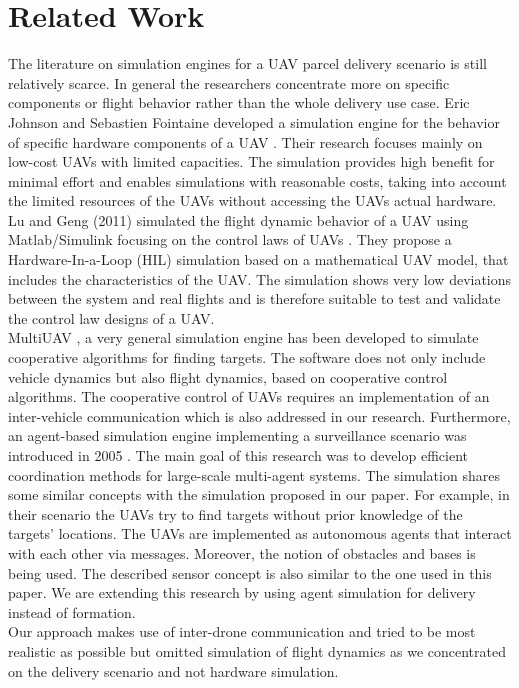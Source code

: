 \section{Related Work}
The literature on simulation engines for a UAV parcel delivery scenario is still relatively scarce. In general the researchers concentrate more on specific components or flight behavior rather than the whole delivery use case. Eric Johnson and Sebastien Fointaine developed a simulation engine for the behavior of specific hardware components of a UAV \cite{johnson.2001}. Their research focuses mainly on low-cost UAVs with limited capacities. The simulation provides high benefit for minimal effort and enables simulations with reasonable costs, taking into account the limited resources of the UAVs without accessing the UAVs actual hardware. Lu and Geng (2011) simulated the flight dynamic behavior of a UAV using Matlab/Simulink focusing on the control laws of UAVs \cite{lu.2011}. They propose a Hardware-In-a-Loop (HIL) simulation based on a mathematical UAV model, that includes the characteristics of the UAV. The simulation shows very low deviations between the system and real flights and is therefore suitable to test and validate the control law designs of a UAV. \\
MultiUAV \cite{rasmussen.2003}, a very general simulation engine has been 
developed to simulate cooperative algorithms for finding targets. The software 
does not only include vehicle dynamics but also flight dynamics, based on 
cooperative control algorithms. The cooperative control of UAVs requires an 
implementation of an inter-vehicle communication which is also addressed in our 
research. Furthermore, an agent-based simulation engine implementing a 
surveillance scenario was introduced in 2005 . The main 
goal of this research was to develop efficient coordination methods for 
large-scale multi-agent systems. The simulation shares some similar concepts 
with the simulation proposed in our paper. For example, in their scenario the 
UAVs try to find targets without prior knowledge of the targets’ locations. The 
UAVs are implemented as autonomous agents that interact with each other via 
messages. Moreover, the notion of obstacles and bases is being used. The 
described sensor concept is also similar to the one used in this paper. We are 
extending this research by using agent simulation for delivery instead of 
formation.\\
Our approach makes use of inter-drone communication and tried to be most realistic as possible but omitted simulation of flight dynamics as we concentrated on the delivery scenario and not hardware simulation. 

